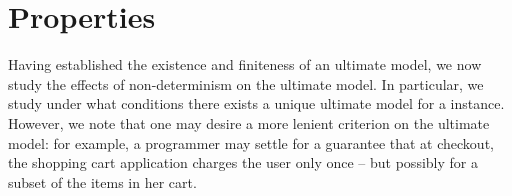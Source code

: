 \section{Properties}
\label{sec:properties}



Having established the existence and finiteness of an ultimate model, we now
study the effects of non-determinism on the ultimate model.  In particular, we
study under what conditions there exists a unique ultimate model for a \lang
instance.  However, we note that one may desire a more lenient criterion on the
ultimate model: for example, a programmer may settle for a guarantee that at
checkout, the shopping cart application charges the user only once -- but
possibly for a subset of the items in her cart.



